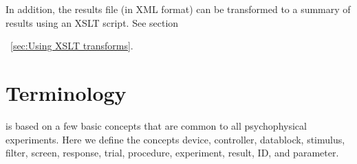 In addition, the results file (in XML format) can be transformed
to a summary of results using an XSLT script. See
section{~\ref{sec:Using XSLT transforms}.



\section{Terminology}

\apex is based on a few basic concepts that are common to all
psychophysical experiments. Here we define the concepts device,
controller, datablock, stimulus, filter, screen, response, trial,
procedure, experiment, result, ID, and parameter.

\begin{description}
 


\end{description}}
